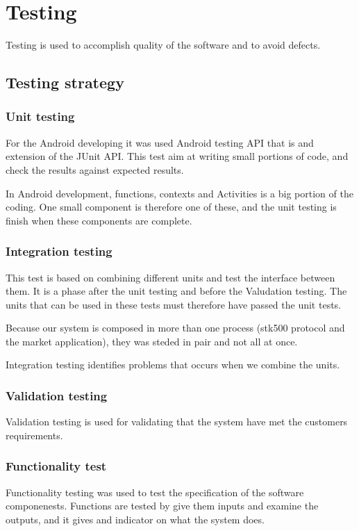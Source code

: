 \section{Testing}
	Testing is used to accomplish quality of the software and to avoid defects.
	
	\subsection{Testing strategy}

		\subsubsection{Unit testing}
			For the Android developing it was used Android testing API that is and extension of the JUnit API.
			This test aim at writing small portions of code, and check the results against expected results.

			In Android development, functions, contexts and Activities is a big portion of the coding.
			One small component is therefore one of these, and the unit testing is finish when these components are complete.

		\subsubsection{Integration testing}
			This test is based on combining different units and test the interface between them. It is a phase after the unit testing and before the Valudation testing. The units that can be used in these tests must therefore have passed the unit tests.

			Because our system is composed in more than one process (stk500 protocol and the market application), they 
			was steded in pair and not all at once.

			Integration testing identifies problems that occurs when we combine the units.

		\subsubsection{Validation testing}
			Validation testing is used for validating that the system have met the customers requirements.

		\subsubsection{Functionality test}
			Functionality testing was used to test the specification of the software componenests.
			Functions are tested by give them inputs and examine the outputs, and it gives and indicator on what the system does.\\

